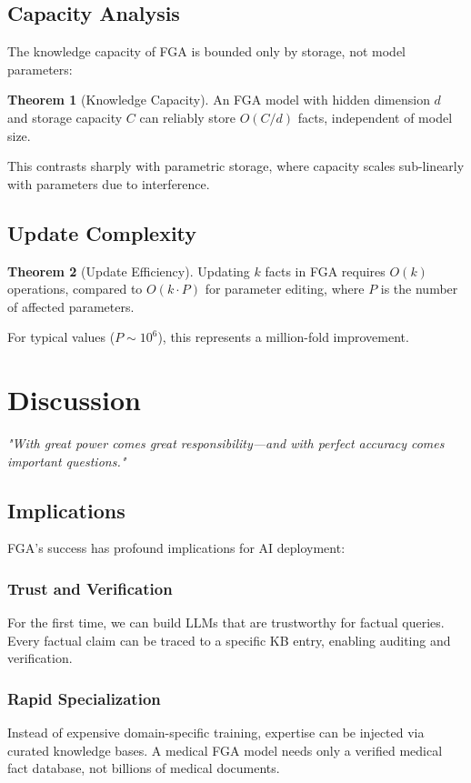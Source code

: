 \documentclass[11pt, a4paper]{article}
\theoremstyle{definition}
\newtheorem{theorem}{Theorem}
\begin{document}
\subsection{Capacity Analysis}

The knowledge capacity of FGA is bounded only by storage, not model parameters:

\begin{theorem}[Knowledge Capacity]
An FGA model with hidden dimension $d$ and storage capacity $C$ can reliably store $O(C/d)$ facts, independent of model size.
\end{theorem}

This contrasts sharply with parametric storage, where capacity scales sub-linearly with parameters due to interference.

\subsection{Update Complexity}

\begin{theorem}[Update Efficiency]
Updating $k$ facts in FGA requires $O(k)$ operations, compared to $O(k \cdot P)$ for parameter editing, where $P$ is the number of affected parameters.
\end{theorem}

For typical values ($P \sim 10^6$), this represents a million-fold improvement.

\section{Discussion}

\textit{"With great power comes great responsibility—and with perfect accuracy comes important questions."}

\subsection{Implications}

FGA's success has profound implications for AI deployment:

\subsubsection{Trust and Verification}
For the first time, we can build LLMs that are trustworthy for factual queries. Every factual claim can be traced to a specific KB entry, enabling auditing and verification.

\subsubsection{Rapid Specialization}
Instead of expensive domain-specific training, expertise can be injected via curated knowledge bases. A medical FGA model needs only a verified medical fact database, not billions of medical documents.
\end{document}
